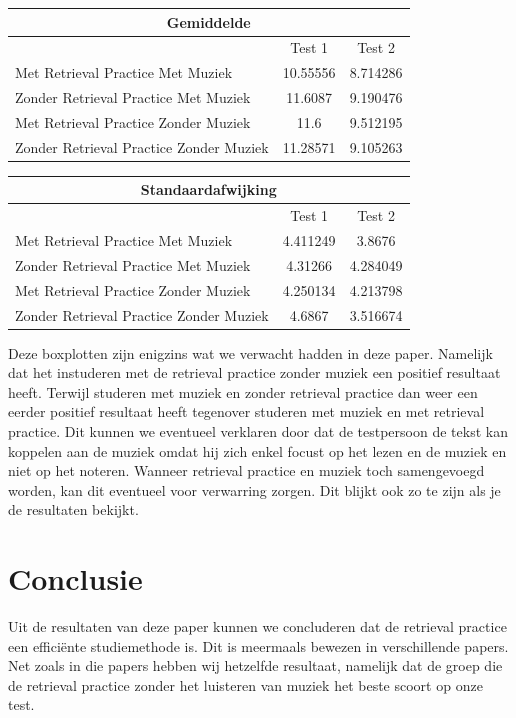 \documentclass{hogent-article}
\begin{document}
	\begin{tabular}{ |p{10em}|c|c| }
	\hline
		\multicolumn{3}{|c|}{Gemiddelde} \\
	\hline
		& Test 1 & Test 2 \\
	\hline
		Met Retrieval Practice Met Muziek  & 10.55556 & 8.714286 \\
	\hline
		Zonder Retrieval Practice Met Muziek & 11.6087 & 9.190476 \\
	\hline
		Met Retrieval Practice Zonder Muziek & 11.6 & 9.512195 \\
	\hline
		Zonder Retrieval Practice Zonder Muziek & 11.28571 & 9.105263 \\
	\hline
	\end{tabular}

	\begin{tabular}{ |p{10em} |c|c| }
	\hline
		\multicolumn{3}{|c|}{Standaardafwijking} \\
	\hline
		& Test 1 & Test 2 \\
	\hline
		Met Retrieval Practice Met Muziek  & 4.411249 & 3.8676\\
	\hline
		Zonder Retrieval Practice Met Muziek & 4.31266 & 4.284049 \\
	\hline
		Met Retrieval Practice Zonder Muziek & 4.250134  & 4.213798\\
	\hline
		Zonder Retrieval Practice Zonder Muziek & 4.6867 & 3.516674 \\
	\hline
	\end{tabular}
	
	Deze boxplotten zijn enigzins wat we verwacht hadden in deze paper. Namelijk dat het instuderen met de retrieval practice zonder muziek een positief resultaat heeft. Terwijl studeren met muziek en zonder retrieval practice dan weer een eerder positief resultaat heeft tegenover studeren met muziek en met retrieval practice. Dit kunnen we eventueel verklaren door dat de testpersoon de tekst kan koppelen aan de muziek omdat hij zich enkel focust op het lezen en de muziek en niet op het noteren. Wanneer retrieval practice en muziek toch samengevoegd worden, kan dit eventueel voor verwarring zorgen. Dit blijkt ook zo te zijn als je de resultaten bekijkt. 
	
	\section{Conclusie}
	Uit de resultaten van deze paper kunnen we concluderen dat de retrieval practice een efficiënte studiemethode is. Dit is meermaals bewezen in verschillende papers. Net zoals in die papers hebben wij hetzelfde resultaat, namelijk dat de groep die de retrieval practice zonder het luisteren van muziek het beste scoort op onze test.
	
\end{document}
